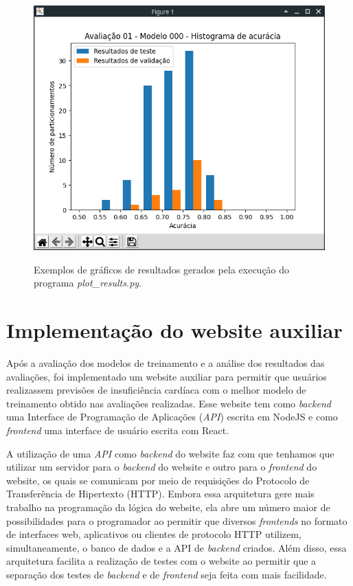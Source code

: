 \begin{figure}[h]
{    \includegraphics[scale=0.3]{images/exemplo_histograma_resultados.png}
    \label{fig:example_results_histogram}
  }
	\caption{Exemplos de gráficos de resultados gerados pela execução do programa \textit{plot\_results.py}.}
	\label{fig:example_results_plot}
\end{figure}

\section{Implementação do website auxiliar}

Após a avaliação dos modelos de treinamento e a análise dos resultados das avaliações, foi implementado um website auxiliar para permitir que usuários realizassem previsões de insuficiência cardíaca com o melhor modelo de treinamento obtido nas avaliações realizadas. Esse website tem como \textit{backend} uma Interface de Programação de Aplicações (\textit{API}) escrita em NodeJS e como \textit{frontend} uma interface de usuário escrita com React.

A utilização de uma \textit{API} como \textit{backend} do website faz com que tenhamos que utilizar um servidor para o \textit{backend} do website e outro para o \textit{frontend} do website, os quais se comunicam por meio de requisições do Protocolo de Transferência de Hipertexto (HTTP). Embora essa arquitetura gere mais trabalho na programação da lógica do website, ela abre um número maior de possibilidades para o programador ao permitir que diversos \textit{frontends} no formato de interfaces web, aplicativos ou clientes de protocolo HTTP utilizem, simultaneamente, o banco de dados e a API de \textit{backend} criados. Além disso, essa arquitetura facilita a realização de testes com o website ao permitir que a separação dos testes de \textit{backend} e de \textit{frontend} seja feita com mais facilidade.

